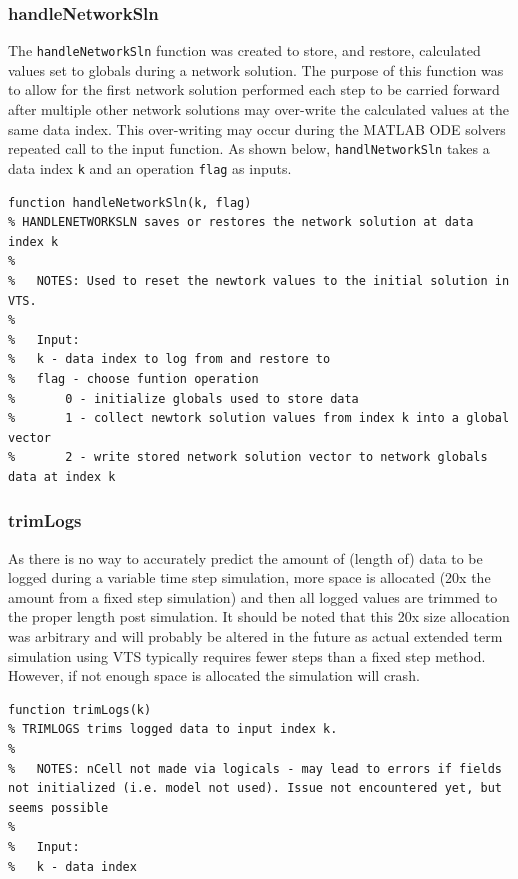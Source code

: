 \subsubsection{handleNetworkSln}  
The \verb|handleNetworkSln| function was created to store, and restore, calculated values set to globals during a network solution.
The purpose of this function was to allow for the first network solution performed each step to be carried forward after multiple other network solutions may over-write the calculated values at the same data index.
This over-writing may occur during the MATLAB ODE solvers repeated call to the input function.
As shown below, \verb|handlNetworkSln| takes a data index \verb|k| and an operation \verb|flag| as inputs.
\begin{verbatim}
function handleNetworkSln(k, flag)
% HANDLENETWORKSLN saves or restores the network solution at data index k
%
%   NOTES: Used to reset the newtork values to the initial solution in VTS.
%
%   Input:
%   k - data index to log from and restore to
%   flag - choose funtion operation
%       0 - initialize globals used to store data
%       1 - collect newtork solution values from index k into a global vector
%       2 - write stored network solution vector to network globals data at index k
\end{verbatim}

\subsubsection{trimLogs}  
As there is no way to accurately predict the amount of (length of) data to be logged during a variable time step simulation, more space is allocated (20x the amount from a fixed step simulation) and then all logged values are trimmed to the proper length post simulation.
It should be noted that this 20x size allocation was arbitrary and will probably be altered in the future as actual extended term simulation using VTS typically requires fewer steps than a fixed step method.
However, if not enough space is allocated the simulation will crash.

\begin{verbatim}
function trimLogs(k)
% TRIMLOGS trims logged data to input index k.
%
%   NOTES: nCell not made via logicals - may lead to errors if fields not initialized (i.e. model not used). Issue not encountered yet, but seems possible
%
%   Input:
%   k - data index
\end{verbatim} 

